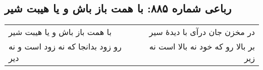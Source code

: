 \begin{center}
\section*{رباعی شماره ۸۸۵: با همت باز باش و یا هیبت شیر}
\label{sec:0885}
\begin{longtable}{l p{0.5cm} r}
با همت باز باش و یا هیبت شیر
&&
در مخزن جان درآی با دیدهٔ سیر
\\
رو زود بدانجا که نه زود است و نه دیر
&&
بر بالا رو که خود نه بالا است نه زیر
\\
\end{longtable}
\end{center}
